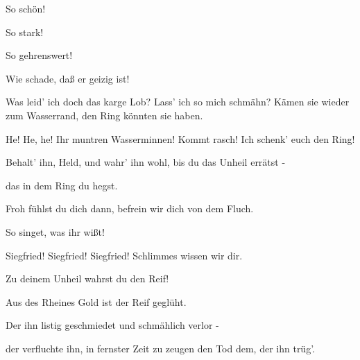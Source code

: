 \begin{drama}


\Flosshildespeaks

So schön!
 

\Wellgundespeaks

So stark!
 

\Woglindespeaks

So gehrenswert!
 

Wie schade, daß er geizig ist!
 




\Siegfriedspeaks



Was leid' ich doch das karge Lob?
Lass' ich so mich schmähn?
Kämen sie wieder zum Wasserrand,
den Ring könnten sie haben.


He! He, he! Ihr muntren Wasserminnen!
Kommt rasch! Ich schenk' euch den Ring!






\Flosshildespeaks

Behalt' ihn, Held, und wahr' ihn wohl,
bis du das Unheil errätst -
 

das in dem Ring du hegst.
 

Froh fühlst du dich dann,
befrein wir dich von dem Fluch.
 

\Siegfriedspeaks



So singet, was ihr wißt!
 

Siegfried! Siegfried! Siegfried!
Schlimmes wissen wir dir.
 

\Wellgundespeaks

Zu deinem Unheil wahrst du den Reif!
 

Aus des Rheines Gold ist der Reif geglüht.
 

\Wellgundespeaks

Der ihn listig geschmiedet und schmählich verlor -
 

der verfluchte ihn, in fernster Zeit
zu zeugen den Tod dem, der ihn trüg'.
 


\end{drama}
